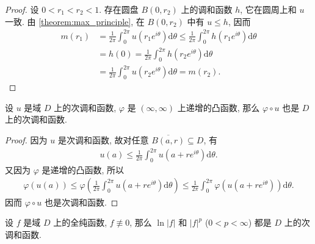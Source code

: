 \documentclass[../../main.tex]{subfiles}%
\begin{document}
\begin{proof}
设 \(0 < r_1 < r_2 < 1\). 存在圆盘 \(B(0,r_2)\) 上的调和函数 \(h\), 它在圆周上和 \(u\) 一致. 由 \cref{theorem:max_principle}, 在 \(B(0,r_2)\) 中有 \(u \leqslant h\), 因而
\begin{align*}
m(r_1) &= \frac{1}{2\pi} \int_{0}^{2\pi} u(r_1e^{i\theta}) \mathrm{d}\theta \leqslant \frac{1}{2\pi} \int_{0}^{2\pi} h(r_1e^{i\theta}) \mathrm{d}\theta \\
&= h(0) = \frac{1}{2\pi} \int_{0}^{2\pi} h(r_2e^{i\theta}) \mathrm{d}\theta \\
&= \frac{1}{2\pi} \int_{0}^{2\pi} u(r_2e^{i\theta}) \mathrm{d}\theta = m(r_2).
\end{align*}
\end{proof}

\begin{proposition}
\label{proposition:convex_composition}
设 \(u\) 是域 \(D\) 上的次调和函数, \(\varphi\) 是 \((\infty, \infty)\) 上递增的凸函数, 那么 \(\varphi \circ u\) 也是 \(D\) 上的次调和函数.
\end{proposition}

\begin{proof}
因为 \(u\) 是次调和函数, 故对任意 \(\overline{B(a,r)} \subseteq D\), 有
\begin{align*}
u(a) \leqslant \frac{1}{2\pi} \int_{0}^{2\pi} u(a+re^{i\theta}) \mathrm{d}\theta.
\end{align*}
又因为 \(\varphi\) 是递增的凸函数, 所以
\begin{align*}
\varphi(u(a)) \leqslant \varphi\left( \frac{1}{2\pi} \int_{0}^{2\pi} u(a+re^{i\theta}) \mathrm{d}\theta \right) \leqslant \frac{1}{2\pi} \int_{0}^{2\pi} \varphi(u(a+re^{i\theta})) \mathrm{d}\theta.
\end{align*}
因而 \(\varphi \circ u\) 也是次调和函数.
\end{proof}

\begin{proposition}
\label{proposition:analytic_subharmonic}
设 \(f\) 是域 \(D\) 上的全纯函数, \(f \not\equiv 0\), 那么 \(\ln |f|\) 和 \(|f|^p\) (\(0 < p < \infty\)) 都是 \(D\) 上的次调和函数.
\end{proposition}
\end{document}
